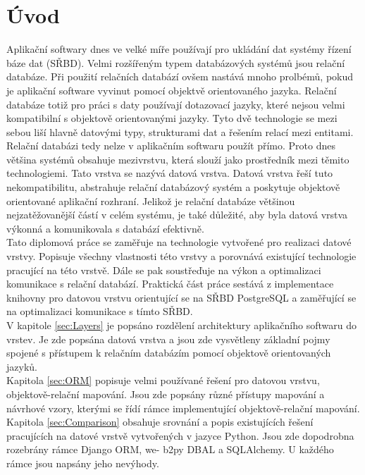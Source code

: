 \documentclass[ing,male,java,dept456]{diploma}						%
\begin{document}
\section{Úvod}
\label{sec:Intro}
Aplikační softwary dnes ve velké míře používají pro ukládání dat systémy řízení báze dat (SŘBD). Velmi rozšířeným typem databázových systémů jsou relační databáze. Při použití relačních databází ovšem nastává mnoho prolbémů, pokud je aplikační software vyvinut pomocí objektvě orientovaného jazyka. Relační databáze totiž pro práci s daty používají dotazovací jazyky, které nejsou velmi kompatibilní s objektově orientovanými jazyky. Tyto dvě technologie se mezi sebou liší hlavně datovými typy, strukturami dat a řešením relací mezi entitami. \\
Relační databázi tedy nelze v aplikačním softwaru použít přímo. Proto dnes většina systémů obsahuje mezivrstvu, která slouží jako prostředník mezi těmito technologiemi. Tato vrstva se nazývá datová vrstva. Datová vrstva řeší tuto nekompatibilitu, abstrahuje relační databázový systém a poskytuje objektově orientované aplikační rozhraní. Jelikož je relační databáze většinou nejzatěžovanější částí v celém systému, je také důležité, aby byla datová vrstva výkonná a komunikovala s databází efektivně. \\
Tato diplomová práce se zaměřuje na technologie vytvořené pro realizaci datové vrstvy. Popisuje všechny vlastnosti této vrstvy a porovnává existující technologie pracující na této vrstvě. Dále se pak soustřeďuje na výkon a optimalizaci komunikace s relační databází. Praktická část práce sestává z implementace knihovny pro datovou vrstvu orientující se na SŘBD PostgreSQL a zaměřující se na optimalizaci komunikace s tímto SŘBD. \\
V kapitole \ref{sec:Layers} je popsáno rozdělení architektury aplikačního softwaru do vrstev. Je zde popsána datová vrstva a jsou zde vysvětleny základní pojmy spojené s přístupem k relačním databázím pomocí objektově orientovaných jazyků. \\
Kapitola \ref{sec:ORM} popisuje velmi používané řešení pro datovou vrstvu, objektově-relační mapování. Jsou zde popsány různé přístupy mapování a návrhové vzory, kterými se řídí rámce implementující objektově-relační mapování. \\
Kapitola \ref{sec:Comparison} obsahuje srovnání a popis existujících řešení pracujících na datové vrstvě vytvořených v jazyce Python. Jsou zde dopodrobna rozebrány rámce Django ORM, we- b2py DBAL a SQLAlchemy. U každého rámce jsou napsány jeho nevýhody. \\
\end{document}
